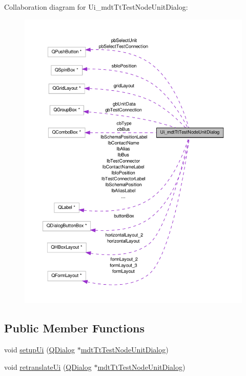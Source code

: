 Collaboration diagram for Ui\-\_\-mdt\-Tt\-Test\-Node\-Unit\-Dialog\-:
\nopagebreak
\begin{figure}[H]
\begin{center}
\leavevmode
\includegraphics[width=350pt]{class_ui__mdt_tt_test_node_unit_dialog__coll__graph}
\end{center}
\end{figure}
\subsection*{Public Member Functions}
\begin{DoxyCompactItemize}
\item 
void \hyperlink{class_ui__mdt_tt_test_node_unit_dialog_aa7e31748ea8c6e43fcc5365200263c70}{setup\-Ui} (\hyperlink{class_q_dialog}{Q\-Dialog} $\ast$\hyperlink{classmdt_tt_test_node_unit_dialog}{mdt\-Tt\-Test\-Node\-Unit\-Dialog})
\item 
void \hyperlink{class_ui__mdt_tt_test_node_unit_dialog_a7b0de318445b64271ebc2835055e0fab}{retranslate\-Ui} (\hyperlink{class_q_dialog}{Q\-Dialog} $\ast$\hyperlink{classmdt_tt_test_node_unit_dialog}{mdt\-Tt\-Test\-Node\-Unit\-Dialog})
\end{DoxyCompactItemize}
